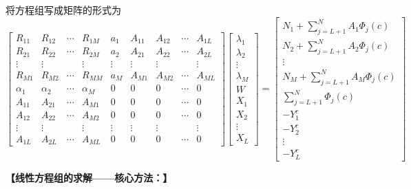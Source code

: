 将方程组写成矩阵的形式为
\begin{equation}
	\begin{bmatrix}
		R_{11} & R_{12} & \cdots & R_{1M} & a_1 & A_{11} & A_{12} & \cdots & A_{1L} \\
		R_{21} & R_{22} & \cdots & R_{2M} & a_2 & A_{21} & A_{22} & \cdots & A_{2L} \\
		\vdots & \vdots & & \vdots & \vdots & \vdots & \vdots & & \vdots \\
		R_{M1} & R_{M2} & \cdots & R_{MM} & a_M & A_{M1} & A_{M2} & \cdots & A_{ML} \\
		\alpha_1 & \alpha_2 & \cdots & \alpha_M & 0 & 0 & 0 & \cdots & 0 \\
		A_{11} & A_{21} & \cdots & A_{M1} & 0 & 0 & 0 & \cdots & 0 \\
		A_{12} & A_{22} & \cdots & A_{M2} & 0 & 0 & 0 & \cdots & 0 \\
		\vdots & \vdots & & \vdots & \vdots & \vdots & \vdots & & \vdots \\
		A_{1L} & A_{2L} & \cdots & A_{ML} & 0 & 0 & 0 & \cdots & 0
	\end{bmatrix}
	\begin{bmatrix}
		\lambda_1 \\
		\lambda_2 \\
		\vdots \\
		\lambda_M\\
		W\\
		X_1 \\
		X_2 \\
		\vdots \\
		X_L
	\end{bmatrix}
 = 
 	\begin{bmatrix}
 		N_1 + \sum_{j = L +1}^{N} A_1\varPhi_j(c) \\
 		N_2 + \sum_{j = L +1}^{N} A_2\varPhi_j(c) \\
 		\vdots \\
 		N_M + \sum_{j = L +1}^{N} A_M\varPhi_j(c) \\
 		\sum_{j = L +1}^{N} \varPhi_j(c) \\
 		-Y_1^c\\
 		-Y_2^c\\
 		\vdots\\
 		-Y_L^c
 	\end{bmatrix}
\end{equation}
\vspace*{0.5em}

\noindent \textbf{【线性方程组的求解——核心方法：\red[迭代法]】}

